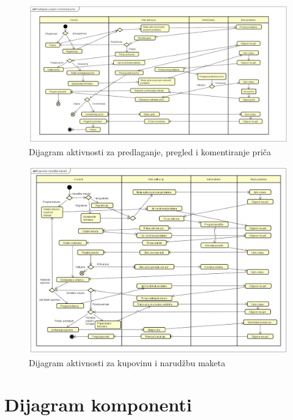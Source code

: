 			\begin{figure}[H]
				\includegraphics[width=1\linewidth]{slike/Dijagram_aktivnosti_1.PNG} %
				\caption{Dijagram aktivnosti za predlaganje, pregled i komentiranje priča}
				\label{fig:diakt1} %
			\end{figure}

			\begin{figure}[H]
				\includegraphics[width=1\linewidth]{slike/Dijagram_aktivnosti_2.PNG} %
				\caption{Dijagram aktivnosti za kupovinu i narudžbu maketa}
				\label{fig:diakt2} %
			\end{figure}
			
			\eject
		\section{Dijagram komponenti}
			
